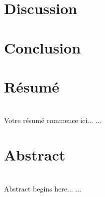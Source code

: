\documentclass[12pt,a4paper]{article}
\begin{document}
\section{Discussion}
\section{Conclusion}
  

%
% 
%
%
%
% 
% 

\newpage 
\thispagestyle{empty}
\section*{Résumé}~\\[0.2cm]
Votre résumé commence ici...
   ...
\section*{Abstract}~\\[0.2cm]
 Abstract begins here...
   ...
\end{document}
